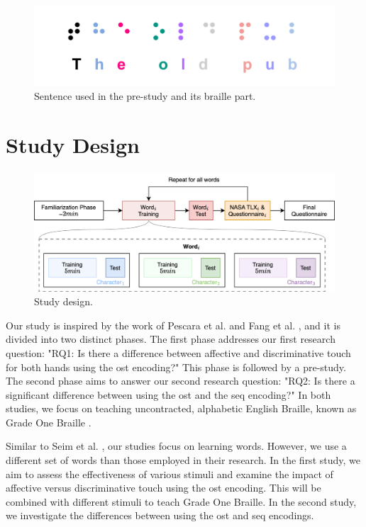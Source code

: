 \begin{figure}
    \centering
    \includegraphics[width=.75\linewidth]{src/pictures/braille_prestudy_characters.drawio.pdf}
    \caption{Sentence used in the pre-study and its braille part.}
    \label{fig:braille_prestudy_characters}
\end{figure}
 


\section{Study Design}

\begin{figure}
    \centering
    \includegraphics[width=0.75\linewidth]{src/pictures/StudyData/Study_design.drawio.png}
    \caption{Study design.}
    \label{fig:study-design}
\end{figure}

Our study is inspired by the work of Pescara et al. \cite{Pescara2019} and Fang et al. \cite{Fang2023}, and it is divided into two distinct phases. The first phase addresses our first research question: "RQ1: Is there a difference between affective and discriminative touch for both hands using the \gls{ost} encoding?" This phase is followed by a pre-study. The second phase aims to answer our second research question: "RQ2: Is there a significant difference between using the \gls{ost} and the \gls{seq} encoding?" In both studies, we focus on teaching uncontracted, alphabetic English Braille, known as Grade One Braille \cite{Troughton1992, Alnfiai2017}.

Similar to Seim et al. \cite{Seim2016, Seim2018}, our studies focus on learning words. However, we use a different set of words than those employed in their research. In the first study, we aim to assess the effectiveness of various stimuli and examine the impact of affective versus discriminative touch using the \gls{ost} encoding. This will be combined with different stimuli to teach Grade One Braille. In the second study, we investigate the differences between using the \gls{ost} and \gls{seq} encodings.

